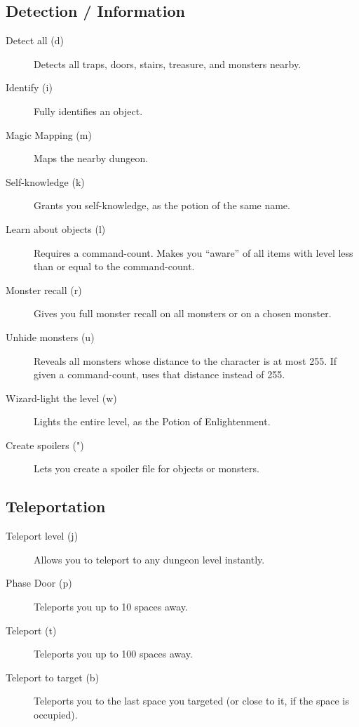 \subsection{Detection / Information}
\begin{description}
\item[Detect all (d)]
    Detects all traps, doors, stairs, treasure, and monsters nearby.

\item[Identify (i)]
    Fully identifies an object.

\item[Magic Mapping (m)]
    Maps the nearby dungeon.

\item[Self-knowledge (k)]
    Grants you self-knowledge, as the potion of the same name.

\item[Learn about objects (l)]
    Requires a command-count. Makes you ``aware'' of all items with level
    less than or equal to the command-count.

\item[Monster recall (r)] Gives you full monster recall on all monsters or on a chosen monster.

\item[Unhide monsters (u)]
    Reveals all monsters whose distance to the character is at most 255.
    If given a command-count, uses that distance instead of 255.

\item[Wizard-light the level (w)]
    Lights the entire level, as the Potion of Enlightenment.

\item[Create spoilers (")]
    Lets you create a spoiler file for objects or monsters.
\end{description}

\subsection{Teleportation}
\begin{description}
\item[Teleport level (j)]
    Allows you to teleport to any dungeon level instantly.

\item[Phase Door (p)]
    Teleports you up to 10 spaces away.

\item[Teleport (t)]
    Teleports you up to 100 spaces away.

\item[Teleport to target (b)]
    Teleports you to the last space you targeted (or close to it, if the
    space is occupied).
\end{description}

